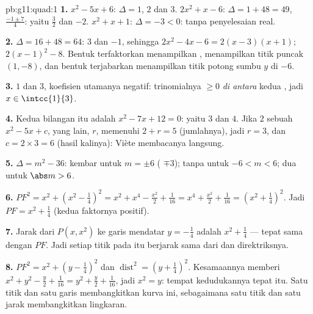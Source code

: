 \begin{solution}{pb:g11:quad:1}
\textbf{1.} $x^2 - 5x + 6$: $\Delta = 1$,  $2$ dan $3$.
$2x^2 + x - 6$: $\Delta = 1 + 48 = 49$, 
$\frac{-1 \pm 7}{4}$: yaitu $\frac32$ dan $-2$. $x^2 + x + 1$:
$\Delta = -3 < 0$: tanpa penyelesaian real.

\textbf{2.} $\Delta = 16 + 48 = 64$:  $3$ dan $-1$, sehingga
$2x^2 - 4x - 6 = 2(x - 3)(x + 1)$; 
$2(x - 1)^2 - 8$. Bentuk terfaktorkan menampilkan ,  menampilkan titik puncak $(1, -8)$, dan bentuk terjabarkan
menampilkan titik potong sumbu $y$ di $-6$.

\textbf{3.}  $1$ dan $3$, koefisien utamanya negatif:
trinomialnya $\geq 0$ \emph{di antara} kedua , jadi
$x \in \intcc{1}{3}$.

\textbf{4.} Kedua bilangan itu adalah  $x^2 - 7x + 12 = 0$:
yaitu $3$ dan $4$. Jika $2$ sebuah  $x^2 - 5x + c$,  yang lain,
$r$, memenuhi $2 + r = 5$ (jumlahnya), jadi $r = 3$, dan
$c = 2 \times 3 = 6$ (hasil kalinya): Viète membacanya langsung.

\textbf{5.} $\Delta = m^2 - 36$:  kembar untuk $m = \pm 6$
( $\mp 3$); tanpa  untuk $-6 < m < 6$; dua  untuk
$\abs m > 6$.

\textbf{6.} $PF^2 = x^2 + \left(x^2 - \frac14\right)^2
= x^2 + x^4 - \frac{x^2}{2} + \frac{1}{16}
= x^4 + \frac{x^2}{2} + \frac{1}{16}
= \left(x^2 + \frac14\right)^2$. Jadi
$PF = x^2 + \frac14$ (kedua faktornya positif).

\textbf{7.} Jarak dari $P(x, x^2)$ ke garis mendatar
$y = -\frac14$ adalah $x^2 + \frac14$ --- tepat sama dengan $PF$. Jadi
setiap titik pada  itu berjarak sama dari  dan
direktriksnya.

\textbf{8.} $PF^2 = x^2 + \left(y - \frac14\right)^2$ dan
$\operatorname{dist}^2 = \left(y + \frac14\right)^2$. Kesamaannya
memberi $x^2 + y^2 - \frac y2 + \frac{1}{16} = y^2 + \frac y2 +
\frac1{16}$, jadi $x^2 = y$: tempat kedudukannya tepat  itu.
Satu titik dan satu garis membangkitkan kurva ini, sebagaimana satu titik
dan satu jarak membangkitkan lingkaran.


\end{solution}
